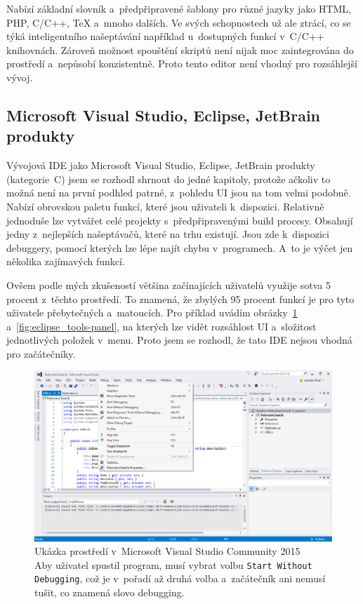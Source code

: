 Nabízí základní slovník a~předpřipravené šablony pro různé jazyky jako HTML, PHP, C/C++, TeX a~mnoho dalších.
Ve svých schopnostech už ale ztrácí, co se týká inteligentního našeptávání například u~dostupných funkcí v~C/C++ knihovnách.
%
Zároveň možnost spouštění skriptů není nijak moc zaintegrována do prostředí a~nepůsobí konzistentně.
Proto tento editor není vhodný pro rozsáhlejší vývoj.

\subsection{Microsoft Visual Studio, Eclipse, JetBrain produkty}


Vývojová IDE jako Microsoft Visual Studio, Eclipse, JetBrain produkty (kategorie~C) jsem se rozhodl shrnout do jedné kapitoly, protože ačkoliv to možná není na první podhled patrné, z~pohledu UI jsou na tom velmi podobně.
Nabízí obrovskou paletu funkcí, které jsou uživateli k~dispozici. 
Relativně jednoduše lze vytvářet celé projekty s~předpřipravenými build procesy. 
Obsahují jedny z~nejlepších našeptávačů, které na trhu existují. 
Jsou zde k~dispozici debuggery, pomocí kterých lze lépe najít chybu v~programech.
A~to je výčet jen několika zajímavých funkcí.

Ovšem podle mých zkušeností většina začínajících uživatelů využije sotva 5 procent z~těchto prostředí. 
To znamená, že zbylých 95 procent funkcí je pro tyto uživatele přebytečných a~matoucích.  
Pro příklad uvádím obrázky~\ref{fig:visual-studio-community-2015} a~\ref{fig:eclipse_tools-panel}, na kterých lze vidět rozsáhlost UI a~složitost jednotlivých položek v~menu.
Proto jsem se rozhodl, že tato IDE nejsou vhodná pro začátečníky. 

\begin{figure}[h]
    \centering
    \includegraphics[width=\textwidth]{images/visual-studio_debug.png}
    \caption[Ukázka prostředí v~Microsoft Visual Studio Community 2015]{Ukázka prostředí v~Microsoft Visual Studio Community 2015 \\
    Aby uživatel spustil program, musí vybrat volbu \texttt{Start Without Debugging}, což je v~pořadí až druhá volba a~začátečník ani nemusí tušit, co znamená slovo debugging. 
    }
    \label{fig:visual-studio-community-2015}
\end{figure}

